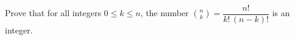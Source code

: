 Prove that for all integers $0\le k\le n$, the number $\binom nk=\dfrac{n!}{k!\,(n-k)!}$ is an integer.
